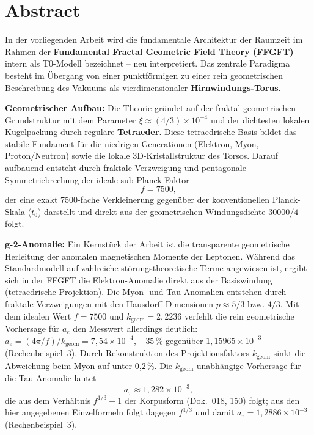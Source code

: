 \section*{Abstract}
		In der vorliegenden Arbeit wird die fundamentale Architektur der Raumzeit im Rahmen der \textbf{Fundamental Fractal Geometric Field Theory (FFGFT)} – intern als T0-Modell bezeichnet – neu interpretiert. Das zentrale Paradigma besteht im Übergang von einer punktförmigen zu einer rein geometrischen Beschreibung des Vakuums als vierdimensionaler \textbf{Hirnwindungs-Torus}.
		
		\textbf{Geometrischer Aufbau:} Die Theorie gründet auf der fraktal-geometrischen Grundstruktur mit dem Parameter $\xi \approx (4/3)\times 10^{-4}$ und der dichtesten lokalen Kugelpackung durch reguläre \textbf{Tetraeder}. Diese tetraedrische Basis bildet das stabile Fundament für die niedrigen Generationen (Elektron, Myon, Proton/Neutron) sowie die lokale 3D-Kristallstruktur des Torsos. Darauf aufbauend entsteht durch fraktale Verzweigung und pentagonale Symmetriebrechung der ideale sub-Planck-Faktor
		\begin{equation*}
			f = 7500,
		\end{equation*}
		der eine exakt 7500-fache Verkleinerung gegenüber der konventionellen Planck-Skala ($t_0$) darstellt und direkt aus der geometrischen Windungsdichte $30000/4$ folgt.
		
		\textbf{g-2-Anomalie:} Ein Kernstück der Arbeit ist die transparente geometrische Herleitung der anomalen magnetischen Momente der Leptonen. Während das Standardmodell auf zahlreiche störungstheoretische Terme angewiesen ist, ergibt sich in der FFGFT die Elektron-Anomalie direkt aus der Basiswindung (tetraedrische Projektion). Die Myon- und Tau-Anomalien entstehen durch fraktale Verzweigungen mit den Hausdorff-Dimensionen $p \approx 5/3$ bzw. $4/3$. Mit dem idealen Wert $f = 7500$ und $k_\text{geom} = 2{,}2236$ verfehlt die rein geometrische Vorhersage für $a_e$ den Messwert allerdings deutlich: $a_e = (4\pi/f)/k_\text{geom} = 7{,}54\times10^{-4}$, $-35\,\%$ gegenüber $1{,}15965\times10^{-3}$ (Rechenbeispiel~3). Durch Rekonstruktion des Projektionsfaktors $k_\text{geom}$ sinkt die Abweichung beim Myon auf unter 0{,}2\,\%. Die $k_\text{geom}$-unabhängige Vorhersage für die Tau-Anomalie lautet
		\begin{equation*}
			a_\tau \approx 1{,}282 \times 10^{-3},
		\end{equation*}
		die aus dem Verhältnis $f^{1/3} - 1$ der Korpusform (Dok.~018, 150) folgt; aus den hier angegebenen Einzelformeln folgt dagegen $f^{1/3}$ und damit $a_\tau = 1{,}2886\times10^{-3}$ (Rechenbeispiel~3).
		
